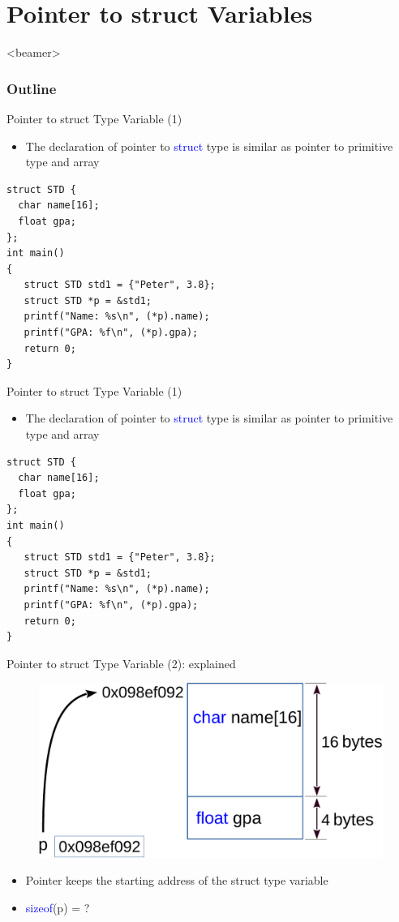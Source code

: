 \section{Pointer to struct Variables}
\label{sec:structs}
\begin{frame}<beamer>
    \frametitle{Outline}
    \tableofcontents[currentsection]
\end{frame}

\begin{frame}[fragile]{Pointer to struct Type Variable (1)}
\begin{itemize}
	\item {The declaration of pointer to \textcolor{blue}{struct} type is similar as pointer to primitive type and array}
\end{itemize}
\begin{lstlisting}[basicstyle=\normalsize, xleftmargin=0.05\linewidth, linewidth=0.85\linewidth]
struct STD {
  char name[16];
  float gpa;
};
int main()
{
   struct STD std1 = {"Peter", 3.8};
   struct STD *p = &std1;
   printf("Name: %s\n", (*p).name);
   printf("GPA: %f\n", (*p).gpa);
   return 0;
}
\end{lstlisting}
\end{frame}

\begin{frame}[fragile]{Pointer to struct Type Variable (1)}
\begin{itemize}
	\item {The declaration of pointer to \textcolor{blue}{struct} type is similar as pointer to primitive type and array}
\end{itemize}
\begin{lstlisting}[basicstyle=\normalsize, xleftmargin=0.1\linewidth, linewidth=0.9\linewidth]
struct STD {
  char name[16];
  float gpa;
};
int main()
{
   struct STD std1 = {"Peter", 3.8};
   struct STD *p = &std1;
   printf("Name: %s\n", (*p).name);
   printf("GPA: %f\n", (*p).gpa);
   return 0;
}
\end{lstlisting}
\end{frame}

\begin{frame}[fragile]{Pointer to struct Type Variable (2): explained}
\vspace{0.15in}
\begin{figure}
	\includegraphics[width=0.55\linewidth]{figs/p2struct.pdf}
\end{figure}
\begin{itemize}
	\item {Pointer keeps the starting address of the struct type variable}
	\item {\textcolor{blue}{sizeof}(p) = ?}
\end{itemize}
\end{frame}

